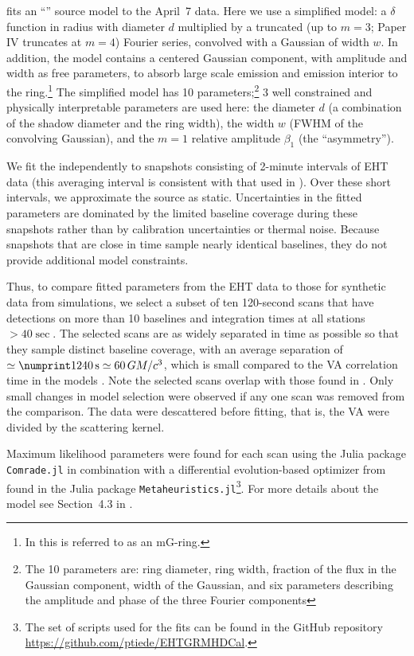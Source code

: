  fits an ``\mring'' source model to the April~7 data.
Here we use a simplified \mring model: a $\delta$ function in radius with diameter $d$ multiplied by a truncated (up to $m = 3$; Paper IV truncates at $m = 4$) Fourier series, convolved with a Gaussian of width $w$.
In addition, the model contains a centered Gaussian component, with amplitude and width as free parameters, to absorb large scale emission and emission interior to the ring.\footnote{In \cite{PaperIV} this is referred to as an mG-ring.}
The simplified \mring model has 10 parameters;\footnote{The 10 parameters are: ring diameter, ring width, fraction of the flux in the Gaussian component, width of the Gaussian, and six parameters describing the amplitude and phase of the three Fourier components} 3 well constrained and physically interpretable parameters are used here: the \mring diameter $d$ (a combination of the shadow diameter and the ring width), the \mring width $w$ (FWHM of the convolving Gaussian), and the $m=1$ relative amplitude $\beta_1$ (the ``asymmetry'').

We fit the \mring independently to snapshots consisting of 2-minute intervals of EHT data (this averaging interval is consistent with that used in ).
Over these short intervals, we approximate the source as static.
Uncertainties in the fitted \mring parameters are dominated by the limited baseline coverage during these snapshots rather than by calibration uncertainties or thermal noise.
Because snapshots that are close in time sample nearly identical baselines, they do not provide additional model constraints.

Thus, to compare fitted \mring parameters from the EHT data to those for synthetic data from simulations, we select a subset of ten 120-second scans  that have detections on more than 10 baselines and integration times at all stations $> 40\sec$.
The selected scans are as widely separated in time as possible so that they sample distinct baseline coverage, with an average separation of $\simeq \no{1240}\sec \simeq 60 \,\tg$, which is small compared to the VA correlation time in the models \citep{Georgiev_2022}.
Note the selected scans overlap with those found in \citep{BestTime}.
Only small changes in model selection were observed if any one scan was removed from the comparison.
The data were descattered before fitting, that is, the VA were divided by the scattering kernel.

Maximum likelihood \mring parameters were found for each scan using the Julia package \texttt{Comrade.jl} \citep{comrade} in combination with a differential evolution-based optimizer from \cite{meijia} found in the Julia package \texttt{Metaheuristics.jl}\footnote{The set of scripts used for the fits can be found in the GitHub repository \url{https://github.com/ptiede/EHTGRMHDCal}.}.
For more details about the \mring model see Section~4.3 in \cite{PaperIV}.

